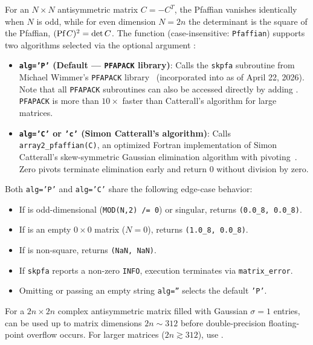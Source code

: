 For an $N\times N$ antisymmetric matrix $C = -C^T$, the Pfaffian vanishes identically when $N$ is odd, while for even dimension $N = 2n$ the determinant is the square of the Pfaffian, $(\text{Pf}\, C)^2 = \det C$. The function  (case-insensitive: \texttt{Pfaffian}) supports two algorithms selected via the optional argument :
\begin{itemize}
  \item \textbf{\texttt{alg='P'} (Default --- \texttt{PFAPACK} library)}: Calls the \texttt{skpfa} subroutine from Michael Wimmer's \texttt{PFAPACK} library~\cite{Wimmer_2012,pfapack} (incorporated into  as of April 22, 2026). Note that all \texttt{PFAPACK} subroutines can also be accessed directly by adding . \texttt{PFAPACK} is more than $10\times$ faster than Catterall's algorithm for large matrices.
  \item \textbf{\texttt{alg='C'} or \texttt{'c'} (Simon Catterall's algorithm)}: Calls \texttt{array2\_pfaffian(C)}, an optimized Fortran implementation of Simon Catterall's skew-symmetric Gaussian elimination algorithm with pivoting~\cite{Catterall_2003}. Zero pivots terminate elimination early and return $0$ without division by zero.
\end{itemize}
Both \texttt{alg='P'} and \texttt{alg='C'} share the following edge-case behavior:
\begin{itemize}
  \item If  is odd-dimensional (\texttt{MOD(N,2) /= 0}) or singular,  returns \texttt{(0.0\_8, 0.0\_8)}.
  \item If  is an empty $0\times 0$ matrix ($N = 0$),  returns \texttt{(1.0\_8, 0.0\_8)}.
  \item If  is non-square,  returns \texttt{(NaN, NaN)}.
  \item If \texttt{skpfa} reports a non-zero \texttt{INFO}, execution terminates via \texttt{matrix\_error}.
  \item Omitting  or passing an empty string \texttt{alg=''} selects the default \texttt{'P'}.
\end{itemize}

\begin{warnbox}
For a $2n\times 2n$ complex antisymmetric matrix filled with Gaussian $\sigma = 1$ entries,  can be used up to matrix dimensions $2n \sim 312$ before double-precision floating-point overflow occurs. For larger matrices ($2n \gtrsim 312$), use .
\end{warnbox}

